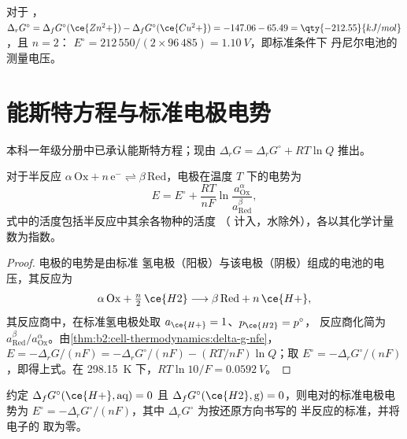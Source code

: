 \begin{example}[丹尼尔电池]\label{ex:b2:cell-thermodynamics:daniell}
对于 ，$\Delta_r G^\circ = \Delta_f G^\circ(\ce{Zn^2+}) -
\Delta_f G^\circ(\ce{Cu^2+}) = -147.06 - 65.49 = \qty{-212.55}{kJ/mol}$，且 $n = 2$：
$E^\circ = 212\,550/(2 \times 96\,485) = \qty{1.10}{V}$，即标准条件下
丹尼尔电池的测量电压。
\end{example}

\section{能斯特方程与标准电极电势}

本科一年级分册中已承认能斯特方程；现由
$\Delta_r G = \Delta_r G^\circ + RT\ln Q$ 推出。

\begin{theorem}[能斯特方程的推导]\label{thm:b2:cell-thermodynamics:nernst-derived}
对于半反应 $\alpha\,\mathrm{Ox} + n\,\mathrm e^- \rightleftharpoons
\beta\,\mathrm{Red}$，电极在温度 $T$ 下的电势为
\[
  E = E^\circ + \frac{RT}{nF}\ln\frac{a_{\mathrm{Ox}}^{\alpha}}{a_{\mathrm{Red}}^{\beta}} ,
\]
式中的活度包括半反应中其余各物种的活度
（ 计入，水除外），各以其化学计量数为指数。
\end{theorem}

\begin{proof}
电极的电势是由标准
氢电极（阳极）与该电极（阴极）组成的电池的电压，其反应为
\[
  \alpha\,\mathrm{Ox} + \tfrac n2\,\ce{H2} \longrightarrow \beta\,\mathrm{Red} + n\,\ce{H+} ,
\]
其反应商中，在标准氢电极处取 $a_{\ce{H+}} = 1$、$p_{\ce{H2}} = p^\circ$，
反应商化简为 $a_{\mathrm{Red}}^\beta/
a_{\mathrm{Ox}}^\alpha$。由\cref{thm:b2:cell-thermodynamics:delta-g-nfe}，
$E = -\Delta_r G/(nF) = -\Delta_r G^\circ/(nF) - (RT/nF)\ln Q$；取 $E^\circ =
-\Delta_r G^\circ/(nF)$，即得上式。在 \qty{298.15}{K} 下，$RT\ln 10/F =
\qty{0.0592}{V}$。
\end{proof}

\begin{proposition}[由吉布斯自由能求标准电极电势]\label{prop:b2:cell-thermodynamics:standard-potential}
约定 $\Delta_f G^\circ(\ce{H+}, \text{aq}) = 0$ 且
$\Delta_f G^\circ(\ce{H2}, \text{g}) = 0$，则电对的标准电极电势为
$E^\circ = -\Delta_r G^\circ/(nF)$，其中 $\Delta_r G^\circ$ 为按还原方向书写的
半反应的标准，并将电子的
取为零。
\end{proposition}

